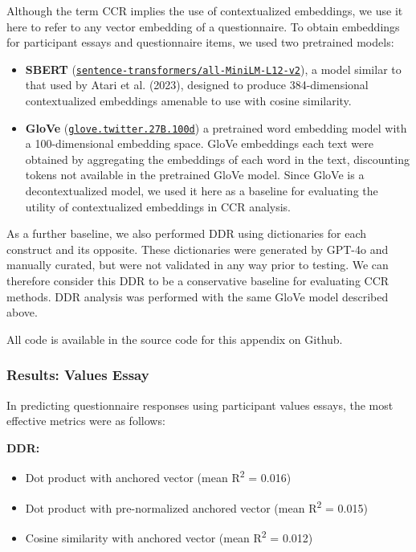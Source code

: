 \documentclass[
  man,
  floatsintext,
  longtable,
  nolmodern,
  notxfonts,
  notimes,
  colorlinks=true,linkcolor=blue,citecolor=blue,urlcolor=blue]{apa7}
\providecommand{\tightlist}{%
  \setlength{\itemsep}{0pt}\setlength{\parskip}{0pt}}
\begin{document}
Although the term CCR implies the use of contextualized embeddings, we
use it here to refer to any vector embedding of a questionnaire. To
obtain embeddings for participant essays and questionnaire items, we
used two pretrained models:

\begin{itemize}
\tightlist
\item
  \textbf{SBERT}
  (\href{https://huggingface.co/sentence-transformers/all-MiniLM-L12-v2}{\texttt{sentence-transformers/all-MiniLM-L12-v2}}),
  a model similar to that used by Atari et al. (2023), designed to
  produce 384-dimensional contextualized embeddings amenable to use with
  cosine similarity.
\item
  \textbf{GloVe}
  (\href{https://huggingface.co/stanfordnlp/glove/tree/main}{\texttt{glove.twitter.27B.100d}})
  a pretrained word embedding model with a 100-dimensional embedding
  space. GloVe embeddings each text were obtained by aggregating the
  embeddings of each word in the text, discounting tokens not available
  in the pretrained GloVe model. Since GloVe is a decontextualized
  model, we used it here as a baseline for evaluating the utility of
  contextualized embeddings in CCR analysis.
\end{itemize}

As a further baseline, we also performed DDR using dictionaries for each
construct and its opposite. These dictionaries were generated by GPT-4o
and manually curated, but were not validated in any way prior to
testing. We can therefore consider this DDR to be a conservative
baseline for evaluating CCR methods. DDR analysis was performed with the
same GloVe model described above.

All code is available in the source code for this appendix on Github.

\subsubsection{Results: Values Essay}\label{results-values-essay}

In predicting questionnaire responses using participant values essays,
the most effective metrics were as follows:

\textbf{DDR:}

\begin{itemize}
\tightlist
\item
  Dot product with anchored vector (mean R\textsuperscript{2} = 0.016)
\item
  Dot product with pre-normalized anchored vector (mean
  R\textsuperscript{2} = 0.015)
\item
  Cosine similarity with anchored vector (mean R\textsuperscript{2} =
  0.012)
\end{itemize}
\end{document}
